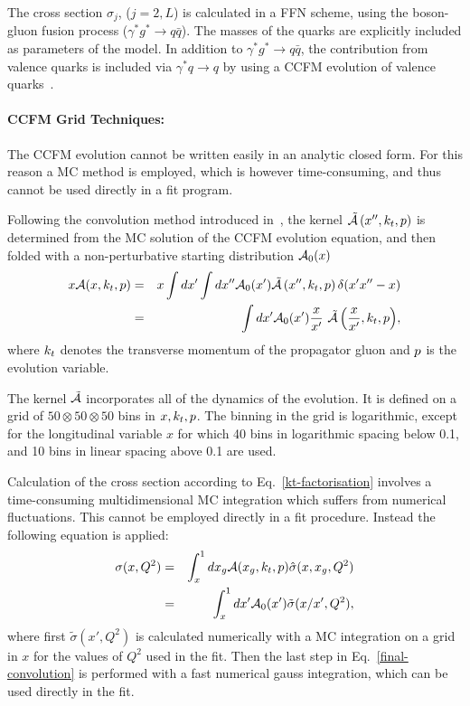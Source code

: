 The cross section $\sigma_j$, ($j= 2, L$) is calculated in a FFN scheme, using the boson-gluon fusion process ($\gamma^* g^* \to q \bar{q}$). The masses of the 
quarks are explicitly included as parameters of the model.
In addition to $\gamma^* g^* \to q\bar{q}$,  the contribution from valence quarks is included 
via $\gamma^* q \to q$ by using a CCFM evolution of 
valence quarks~\cite{Deak:2010gk,Hautmann:2013tba}. 

\paragraph{CCFM Grid Techniques:} \rm

The CCFM evolution cannot be written easily in an analytic closed form. For this 
reason a MC method is employed, which is however time-consuming, and thus
cannot be used directly in a fit program. 

Following the  convolution method introduced in~\cite{Jung:2012hy,Hautmann:2013tba}, the 
kernel $ \tilde {\cal A}\left(x'',\kt,\Pmax\right) $ is determined from the MC  solution of the CCFM evolution equation, 
and then folded with a non-perturbative starting distribution ${\cal A}_0 (x)$
{ 
\begin{eqnarray}
x {\cal A}(x,\kt,\Pmax) &= &x\int dx' \int dx'' {\cal A}_0 (x') \tilde{\cal A}\left(x'',\kt,\Pmax\right) 
 \delta(x' 
x'' - x) 
\nonumber  
\\
& = & \int dx' {{\cal A}_0 (x') }  
\frac{x}{x'} \ { \tilde{\cal A}\left(\frac{x}{x'},\kt,\Pmax\right) }, 
\end{eqnarray}
}
where $k_t$ denotes the transverse momentum of the propagator gluon and $p$ is the 
evolution variable.

The kernel $\tilde{\cal A}$ incorporates all of  the dynamics of the evolution.  
It is defined on a grid of $50\otimes50\otimes50$ bins in $ x, k_t, p$.  
The binning in the grid is logarithmic, except for the longitudinal variable 
$x$ for which 40 bins in logarithmic 
spacing below 0.1, and 10 bins in linear spacing above 0.1 are used.

Calculation of the cross section according to Eq.~\ref{kt-factorisation} involves a time-consuming
multidimensional MC integration which suffers from numerical fluctuations.  
This cannot be employed directly in a fit procedure. Instead the following equation is applied:
\begin{eqnarray}
\sigma(x,Q^2) & = & \int_x^1 d x_g {\cal A}(x_g,\kt,\Pmax) \hat{ \sigma}(x,x_g,Q^2) 
\nonumber\\
  & = & \int_x^1 dx' {\cal A}_0 (x')  \tilde{ \sigma}(x/x',Q^2),
    \label{final-convolution}
 \end{eqnarray}
where first $ \tilde{ \sigma}(x',Q^2)$ is calculated numerically with a MC integration 
on a grid in $x$ for the values of $Q^2$ used in the fit. Then the last step in Eq.~\ref{final-convolution}  
is performed with a fast numerical gauss integration, which can be used directly in the fit.

